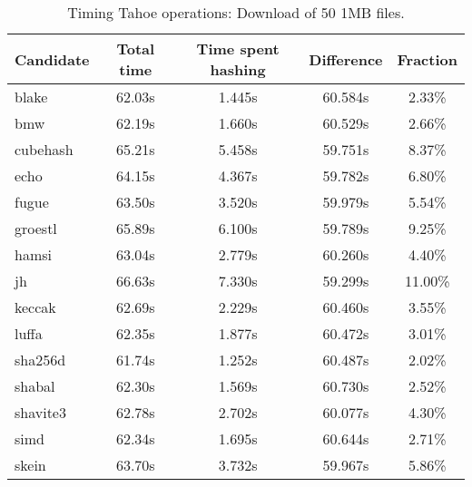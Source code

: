 \begin{table}[h]
  \centering
  \begin{tabular}{ | l | c | c | c | c | }
    \hline
    Candidate & Total time & Time spent hashing & Difference & Fraction \\ \hline
    blake & 62.03s & 1.445s & 60.584s & 2.33\% \\ \hline
    bmw & 62.19s & 1.660s & 60.529s & 2.66\% \\ \hline
    cubehash & 65.21s & 5.458s & 59.751s & 8.37\% \\ \hline
    echo & 64.15s & 4.367s & 59.782s & 6.80\% \\ \hline
    fugue & 63.50s & 3.520s & 59.979s & 5.54\% \\ \hline
    groestl & 65.89s & 6.100s & 59.789s & 9.25\% \\ \hline
    hamsi & 63.04s & 2.779s & 60.260s & 4.40\% \\ \hline
    jh & 66.63s & 7.330s & 59.299s & 11.00\% \\ \hline
    keccak & 62.69s & 2.229s & 60.460s & 3.55\% \\ \hline
    luffa & 62.35s & 1.877s & 60.472s & 3.01\% \\ \hline
    sha256d & 61.74s & 1.252s & 60.487s & 2.02\% \\ \hline
    shabal & 62.30s & 1.569s & 60.730s & 2.52\% \\ \hline
    shavite3 & 62.78s & 2.702s & 60.077s & 4.30\% \\ \hline
    simd & 62.34s & 1.695s & 60.644s & 2.71\% \\ \hline
    skein & 63.70s & 3.732s & 59.967s & 5.86\% \\ \hline
  \end{tabular}
  \caption{Timing Tahoe operations: Download of 50 1MB files.}
  \label{tbl:hashingtimes:get1mb}
\end{table}
